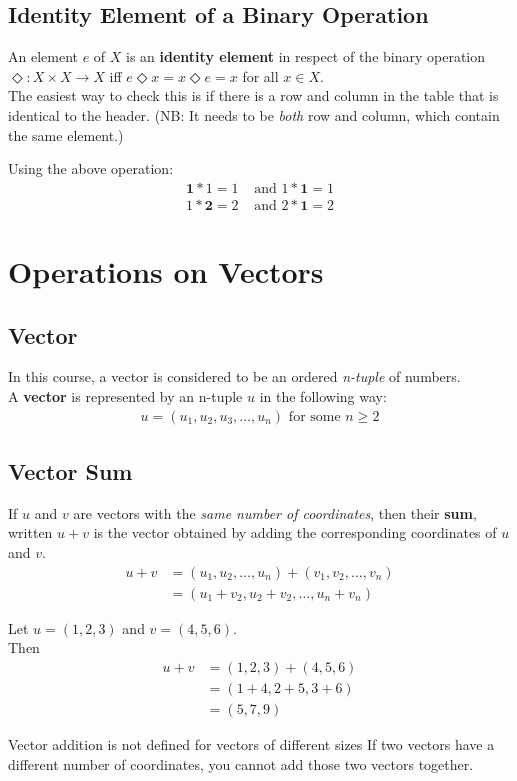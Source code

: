 \documentclass[../notes.tex]{subfiles}
\begin{document}
			\subsection{Identity Element of a Binary Operation}
				An element $e$ of $X$ is an \textbf{identity element} in respect of the binary operation $\Diamond: X \times X \rightarrow X$ iff $e \Diamond x = x \Diamond e = x$ for all $x \in X$.\\
				The easiest way to check this is if there is a row and column in the table that is identical to the header. (NB: It needs to be \textit{both} row and column, which contain the same element.)
				\begin{examplebox}
					Using the above operation:
					\begin{align*}
						\mathbf{1} * 1 = 1 &\text{ and } 1 * \mathbf{1} = 1\\
						1 * \mathbf{2} = 2 &\text{ and } 2 * \mathbf{1} = 2
					\end{align*}
				\end{examplebox}
		\section{Operations on Vectors}
			\subsection{Vector}
				In this course, a vector is considered to be an ordered \textit{n-tuple} of numbers.\\
				A \textbf{vector} is represented by an n-tuple $u$ in the following way:
				\begin{align*}
					u = (u_{1}, u_{2}, u_{3}, \ldots, u_{n}) \text{ for some } n \geq 2
				\end{align*}
			\subsection{Vector Sum}
				If $u$ and $v$ are vectors with the \textit{same number of coordinates}, then their \textbf{sum}, written $u + v$ is the vector obtained by adding the corresponding coordinates of $u$ and $v$.
				\begin{align*}
					u + v &= (u_{1}, u_{2}, \ldots, u_{n}) + (v_{1}, v_{2}, \ldots, v_{n})\\
					&= (u_{1} + v_{2}, u_{2} + v_{2}, \ldots, u_{n} + v_{n})
				\end{align*}
				\begin{examplebox}
					Let $u = (1, 2, 3)$ and $v = (4, 5, 6)$.\\
					Then
					\begin{align*}
						u + v &= (1, 2, 3) + (4, 5, 6)\\
						&= (1 + 4, 2 + 5, 3 + 6)\\
						&= (5, 7, 9)
					\end{align*}
				\end{examplebox}
				\begin{notebox}{Vector addition is not defined for vectors of different sizes}
					If two vectors have a different number of coordinates, you cannot add those two vectors together.
				\end{notebox}
			\pagebreak
\end{document}
